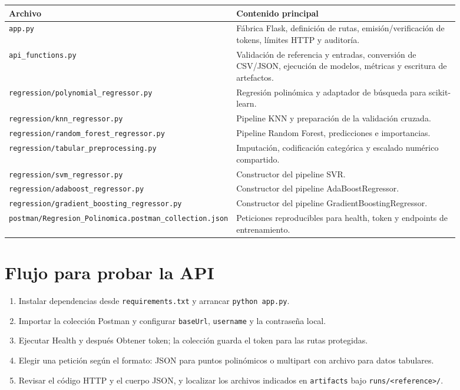 \documentclass[11pt,a4paper]{article}
\begin{document}
\begin{longtable}{p{0.36\linewidth}p{0.53\linewidth}}
\toprule Archivo & Contenido principal \\
\midrule
\endhead
\texttt{app.py} & Fábrica Flask, definición de rutas, emisión/verificación de tokens, límites HTTP y auditoría.\\
\texttt{api\_functions.py} & Validación de referencia y entradas, conversión de CSV/JSON, ejecución de modelos, métricas y escritura de artefactos.\\
\texttt{regression/polynomial\_regressor.py} & Regresión polinómica y adaptador de búsqueda para scikit-learn.\\
\texttt{regression/knn\_regressor.py} & Pipeline KNN y preparación de la validación cruzada.\\
\texttt{regression/random\_forest\_regressor.py} & Pipeline Random Forest, predicciones e importancias.\\
\texttt{regression/tabular\_preprocessing.py} & Imputación, codificación categórica y escalado numérico compartido.\\
\texttt{regression/svm\_regressor.py} & Constructor del pipeline SVR.\\
\texttt{regression/adaboost\_regressor.py} & Constructor del pipeline AdaBoostRegressor.\\
\texttt{regression/gradient\_boosting\_regressor.py} & Constructor del pipeline GradientBoostingRegressor.\\
\texttt{postman/Regresion\_Polinomica.postman\_collection.json} & Peticiones reproducibles para health, token y endpoints de entrenamiento.\\
\bottomrule
\end{longtable}

\section{Flujo para probar la API}
\begin{enumerate}
\item Instalar dependencias desde \texttt{requirements.txt} y arrancar \texttt{python app.py}.
\item Importar la colección Postman y configurar \texttt{baseUrl}, \texttt{username} y la contraseña local.
\item Ejecutar Health y después Obtener token; la colección guarda el token para las rutas protegidas.
\item Elegir una petición según el formato: JSON para puntos polinómicos o multipart con archivo para datos tabulares.
\item Revisar el código HTTP y el cuerpo JSON, y localizar los archivos indicados en \texttt{artifacts} bajo \texttt{runs/<reference>/}.
\end{enumerate}
\end{document}
